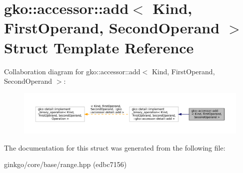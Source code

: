 \hypertarget{structgko_1_1accessor_1_1add}{}\section{gko\+:\+:accessor\+:\+:add$<$ Kind, First\+Operand, Second\+Operand $>$ Struct Template Reference}
\label{structgko_1_1accessor_1_1add}


Collaboration diagram for gko\+:\+:accessor\+:\+:add$<$ Kind, First\+Operand, Second\+Operand $>$\+:
\nopagebreak
\begin{figure}[H]
\begin{center}
\leavevmode
\includegraphics[width=350pt]{structgko_1_1accessor_1_1add__coll__graph}
\end{center}
\end{figure}


The documentation for this struct was generated from the following file\+:\begin{DoxyCompactItemize}
\item 
ginkgo/core/base/range.\+hpp (edbc7156)\end{DoxyCompactItemize}
